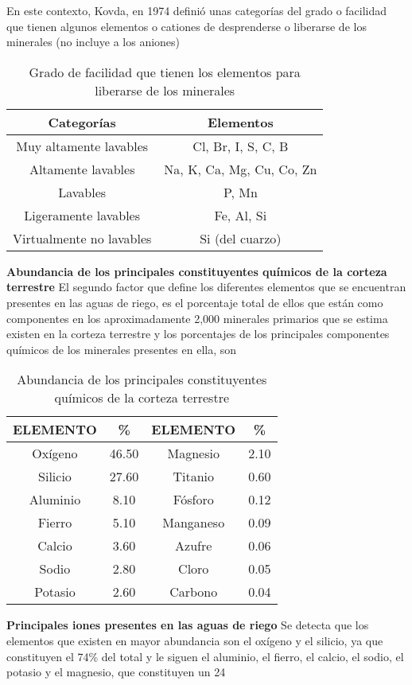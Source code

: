 En este contexto, Kovda, en 1974 definió unas categorías del grado o facilidad que tienen algunos elementos o cationes de desprenderse o liberarse de los minerales (no incluye a los aniones)
\begin{table}[h!]
  \centering
  \begin{tabular}{@{}cc@{}}
  \toprule
  Categorías               & Elementos                 \\ \midrule
  Muy altamente lavables   & Cl, Br, I, S, C, B        \\
  Altamente lavables       & Na, K, Ca, Mg, Cu, Co, Zn \\
  Lavables                 & P, Mn                     \\
  Ligeramente lavables     & Fe, Al, Si                \\
  Virtualmente no lavables & Si (del cuarzo)           \\ \bottomrule
  \end{tabular}
  \caption{Grado de facilidad que tienen los elementos para liberarse de los minerales}
  \label{tabsa17}
 \end{table}
\textbf{Abundancia de los principales constituyentes químicos de la corteza terrestre}
El segundo factor que define los diferentes elementos que se encuentran presentes en las aguas de riego, es el porcentaje total de ellos que están como componentes en los aproximadamente 2,000 minerales primarios que se estima existen en la corteza terrestre y los porcentajes de los principales componentes químicos de los minerales presentes en ella, son
\begin{table}[h!]
  \centering
  \begin{tabular}{@{}cccc@{}}
  \toprule
  ELEMENTO & \%    & ELEMENTO  & \%   \\ \midrule
  Oxígeno  & 46.50 & Magnesio  & 2.10 \\
  Silicio  & 27.60 & Titanio   & 0.60 \\
  Aluminio & 8.10  & Fósforo   & 0.12 \\
  Fierro   & 5.10  & Manganeso & 0.09 \\
  Calcio   & 3.60  & Azufre    & 0.06 \\
  Sodio    & 2.80  & Cloro     & 0.05 \\
  Potasio  & 2.60  & Carbono   & 0.04 \\ \bottomrule
  \end{tabular}
  \caption{Abundancia de los principales constituyentes químicos de la corteza terrestre}
  \label{tabsa18}
  \end{table}
\textbf{Principales iones presentes en las aguas de riego}
Se detecta que los elementos que existen en mayor abundancia son el oxígeno y el silicio, ya que constituyen el 74\% del total y le siguen el aluminio, el fierro, el calcio, el sodio, el potasio y el magnesio, que constituyen un 24%

